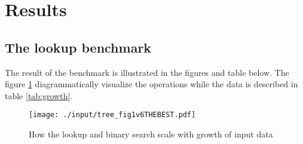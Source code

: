 \documentclass[a4paper, 11pt]{article}
\begin{document}


    \clearpage
    \section*{Results}
    \label{sec:results}
    \subsection*{The lookup benchmark}
    The result of the benchmark is illustrated in the figures and table below.
    The figure \ref{fig:fig1} diagrammatically visualize the operations while the
    data is described in table \ref{tab:growth}.
    
    \begin{figure}[h]
        \centering
        \texttt{[image: ./input/tree\_fig1v6THEBEST.pdf]}
        \caption{How the lookup and binary search scale with growth of input data}
        \label{fig:fig1}
    \end{figure}

\end{document}
